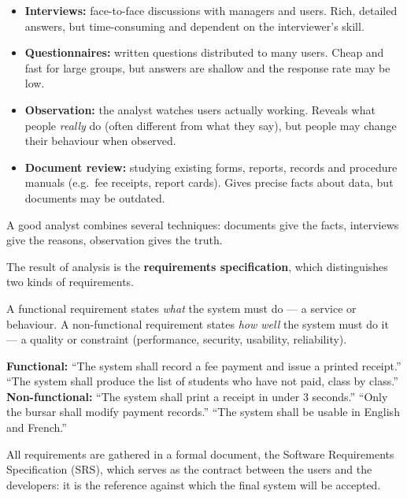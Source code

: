 \documentclass[11pt]{article}
\newcommand{\cle}[1]{{\popxbold\color{popdark}#1}}
\begin{document}
\begin{itemize}
\item \textbf{Interviews:} face-to-face discussions with managers and users. Rich, detailed answers, but time-consuming and dependent on the interviewer's skill.
\item \textbf{Questionnaires:} written questions distributed to many users. Cheap and fast for large groups, but answers are shallow and the response rate may be low.
\item \textbf{Observation:} the analyst watches users actually working. Reveals what people \emph{really} do (often different from what they say), but people may change their behaviour when observed.
\item \textbf{Document review:} studying existing forms, reports, records and procedure manuals (e.g.\ fee receipts, report cards). Gives precise facts about data, but documents may be outdated.
\end{itemize}

A good analyst combines several techniques: documents give the facts, interviews give the reasons, observation gives the truth.

The result of analysis is the \textbf{requirements specification}, which distinguishes two kinds of requirements.

\begin{definition}
A \cle{functional requirement} states \emph{what} the system must do --- a service or behaviour. A \cle{non-functional requirement} states \emph{how well} the system must do it --- a quality or constraint (performance, security, usability, reliability).
\end{definition}

\begin{exemplebox}
\textbf{Functional:} ``The system shall record a fee payment and issue a printed receipt.'' ``The system shall produce the list of students who have not paid, class by class.''\\
\textbf{Non-functional:} ``The system shall print a receipt in under 3 seconds.'' ``Only the bursar shall modify payment records.'' ``The system shall be usable in English and French.''
\end{exemplebox}

All requirements are gathered in a formal document, the \cle{Software Requirements Specification} (SRS), which serves as the contract between the users and the developers: it is the reference against which the final system will be accepted.
\end{document}
